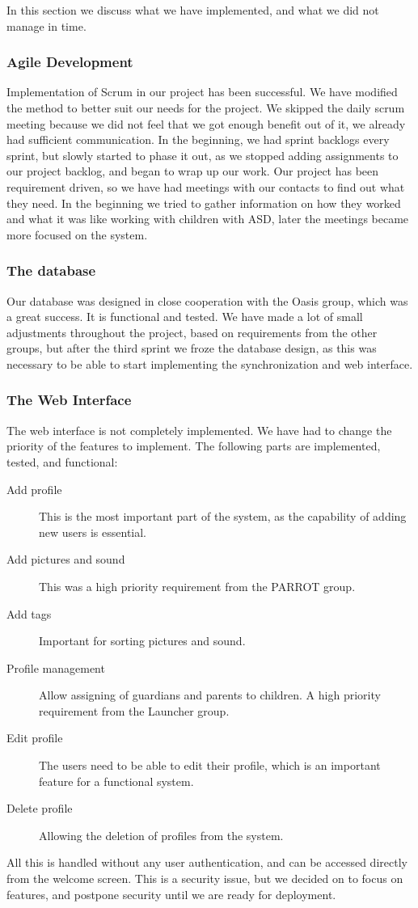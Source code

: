 In this section we discuss what we have implemented, and what we did not manage in time.

\subsubsection*{Agile Development}
Implementation of Scrum in our project has been successful. We have modified the method to better suit our needs for the project. We skipped the daily scrum meeting because we did not feel that we got enough benefit out of it, we already had sufficient communication. In the beginning, we had sprint backlogs every sprint, but slowly started to phase it out, as we stopped adding assignments to our project backlog, and began to wrap up our work. Our project has been requirement driven, so we have had meetings with our contacts to find out what they need. In the beginning we tried to gather information on how they worked and what it was like working with children with ASD, later the meetings became more focused on the system. 

\subsubsection*{The database}
Our database was designed in close cooperation with the Oasis group, which was a great success. It is functional and tested. We have made a lot of small adjustments throughout the project, based on requirements from the other groups, but after the third sprint we froze the database design, as this was necessary to be able to start implementing the synchronization and web interface.

\subsubsection*{The Web Interface}
The web interface is not completely implemented. We have had to change the priority of the features to implement. The following parts are implemented, tested, and functional:
\begin{description}
	\item[Add profile] This is the most important part of the system, as the capability of adding new users is essential.
	\item[Add pictures and sound] This was a high priority requirement from the PARROT group.
	\item[Add tags] Important for sorting pictures and sound.
	\item[Profile management] Allow assigning of guardians and parents to children. A high priority requirement from the Launcher group.
	\item[Edit profile] The users need to be able to edit their profile, which is an important feature for a functional system.
	\item[Delete profile] Allowing the deletion of profiles from the system.
\end{description}
All this is handled without any user authentication, and can be accessed directly from the welcome screen. This is a security issue, but we decided on to focus on features, and postpone security until we are ready for deployment.

